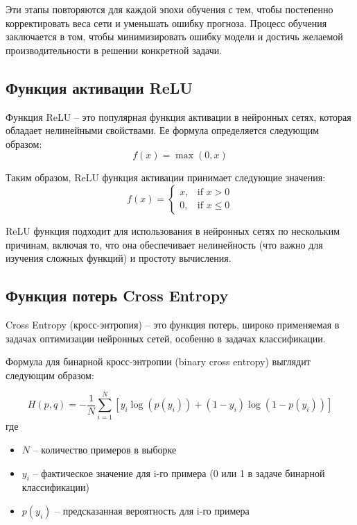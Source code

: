 \documentclass[12pt]{report}
\begin{document}
Эти этапы повторяются для каждой эпохи обучения с тем, чтобы постепенно корректировать веса сети и уменьшать ошибку прогноза. Процесс обучения заключается в том, чтобы минимизировать ошибку модели и достичь желаемой производительности в решении конкретной задачи.

\subsection{Функция активации ReLU}
Функция ReLU -- это популярная функция активации в нейронных сетях, которая обладает нелинейными свойствами. 
Ее формула определяется следующим образом:
\begin{equation}
    f(x) = \max(0, x) 
\end{equation}

Таким образом, ReLU функция активации принимает следующие значения:
\begin{equation}
    f(x) = \begin{cases} 
    x, & \mbox{if } x > 0 \\ 
    0, & \mbox{if } x \leq 0 
    \end{cases} 
\end{equation}

ReLU функция  подходит для использования в нейронных сетях по нескольким причинам, включая то, что она обеспечивает нелинейность (что важно для изучения сложных функций) и простоту вычисления.

\subsection{Функция потерь Cross Entropy}
Cross Entropy (кросс-энтропия) -- это функция потерь, широко применяемая в задачах оптимизации нейронных сетей, особенно в задачах классификации. 

Формула для бинарной кросс-энтропии (binary cross entropy) выглядит следующим образом:

\begin{equation}
    H(p, q) = -\frac{1}{N} \sum_{i=1}^{N} \left[ y_i \log(p(y_i)) + (1 - y_i) \log(1 - p(y_i)) \right] 
\end{equation} 
где
\begin{itemize}
    \item \( N \) -- количество примеров в выборке
    \item \( y_i \) -- фактическое значение для i-го примера (0 или 1 в задаче бинарной классификации)
    \item \( p(y_i) \) -- предсказанная вероятность для i-го примера
\end{itemize}
\end{document}
